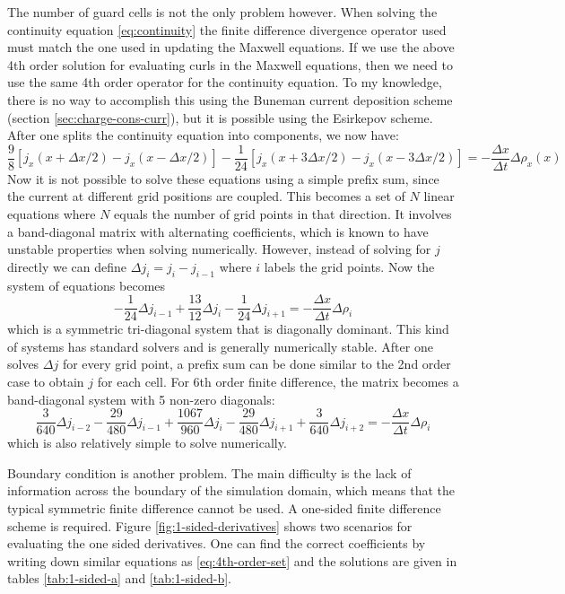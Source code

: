 The number of guard cells is not the only problem however. When solving the
continuity equation \eqref{eq:continuity} the finite difference divergence
operator used must match the one used in updating the Maxwell equations. If we
use the above 4th order solution for evaluating curls in the Maxwell equations,
then we need to use the same 4th order operator for the continuity equation. To
my knowledge, there is no way to accomplish this using the Buneman current
deposition scheme (section \ref{sec:charge-cons-curr}), but it is possible using
the Esirkepov scheme. After one splits the continuity equation into components,
we now have:
\begin{equation}
  \label{eq:4th-order-esirkepov}
  \frac{9}{8}\left[ j_x(x+\Delta x/2) - j_x(x-\Delta x/2)\right] - \frac{1}{24}\left[ j_x(x + 3\Delta x/2) - j_x(x - 3\Delta x/2) \right] = -\frac{\Delta x}{\Delta t}\Delta \rho_x(x)
\end{equation}
Now it is not possible to solve these equations using a simple prefix sum, since
the current at different grid positions are coupled. This becomes a set of $N$
linear equations where $N$ equals the number of grid points in that direction.
It involves a band-diagonal matrix with alternating coefficients, which is known
to have unstable properties when solving numerically. However, instead of
solving for $j$ directly we can define $\Delta j_i = j_i - j_{i-1}$ where $i$
labels the grid points. Now the system of equations becomes
\begin{equation}
  \label{eq:4th-order-system}
  - \frac{1}{24}\Delta j_{i-1} + \frac{13}{12}\Delta j_i - \frac{1}{24}\Delta j_{i+1} = -\frac{\Delta x}{\Delta t}\Delta \rho_{i}
\end{equation}
which is a symmetric tri-diagonal system that is diagonally dominant. This kind
of systems has standard solvers and is generally numerically stable. After one
solves $\Delta j$ for every grid point, a prefix sum can be done similar to the
2nd order case to obtain $j$ for each cell. For 6th order finite difference, the
matrix becomes a band-diagonal system with 5 non-zero diagonals:
\begin{equation}
  \label{eq:6th-order-system}
  \frac{3}{640}\Delta j_{i-2} - \frac{29}{480}\Delta j_{i-1} + \frac{1067}{960}\Delta j_i - \frac{29}{480}\Delta j_{i+1} + \frac{3}{640}\Delta j_{i+2} = -\frac{\Delta x}{\Delta t}\Delta \rho_{i}
\end{equation}
which is also relatively simple to solve numerically.

Boundary condition is another problem. The main difficulty is the lack of
information across the boundary of the simulation domain, which means that the
typical symmetric finite difference cannot be used. A one-sided finite difference
scheme is required. Figure \ref{fig:1-sided-derivatives} shows two scenarios for
evaluating the one sided derivatives. One can find the correct coefficients by
writing down similar equations as \eqref{eq:4th-order-set} and the solutions are
given in tables \ref{tab:1-sided-a} and
\ref{tab:1-sided-b}. %

